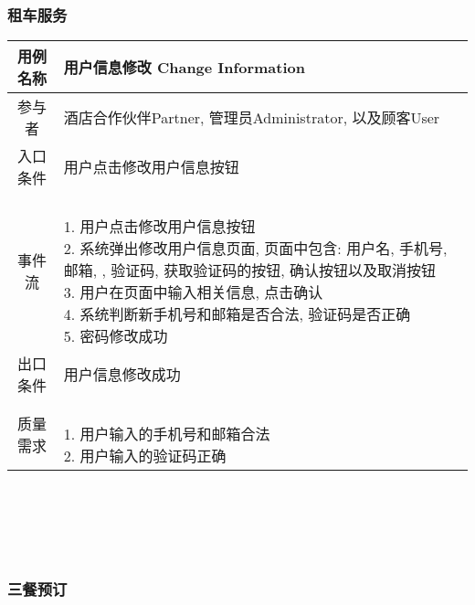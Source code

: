 \documentclass[11pt]{article}
\begin{document}
		\subsubsection{租车服务}
			\begin{tabular}{c|l}
			\cline
			用例名称 & 用户信息修改 Change Information \\ \hline
			参与者 & 酒店合作伙伴Partner, 管理员Administrator, 以及顾客User  \\ \hline
			入口条件 & 用户点击修改用户信息按钮 \\ \hline
			事件流 & 	\parbox{33em}{\ \\
						1. 用户点击修改用户信息按钮 \\
						2. 系统弹出修改用户信息页面, 页面中包含: 用户名, 手机号, 邮箱, , 验证码, 获取验证码的按钮, 确认按钮以及取消按钮\\
						3. 用户在页面中输入相关信息, 点击确认  \\
						4. 系统判断新手机号和邮箱是否合法, 验证码是否正确 \\
						5. 密码修改成功 \\
						} \\ \hline
			出口条件 & 用户信息修改成功 \\ \hline
			质量需求 & \parbox{33em}{\ \\
						1. 用户输入的手机号和邮箱合法 \\
						2. 用户输入的验证码正确 \\
						} \\ \hline
			\end{tabular}\\ \\ \\ \\ 
		\subsubsection{三餐预订}
\end{document}
